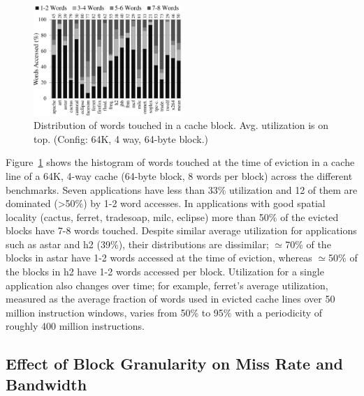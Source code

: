 \begin{figure}[!h]

 \begin{center}
  \includegraphics[width=0.5\textwidth]{files/Plots/05-StackBar_Word_Access_64K.pdf}
  \caption{Distribution of words touched in a cache
    block. Avg. utilization is on top. (Config:
    64K, 4 way, 64-byte block.)}
  \label{fig:stackbar_words_64k}
 \end{center}

\end{figure}

Figure~\ref{fig:stackbar_words_64k} shows the histogram of words
touched at the time of eviction in a cache line of a 64K, 4-way cache 
(64-byte block, 8 words per block) across the different benchmarks. 
Seven applications have
less than 33\% utilization and 12 of them are dominated (>50\%) by 1-2
word accesses.  In applications with good spatial locality (cactus,
ferret, tradesoap, milc, eclipse) more than 50\% of the evicted blocks have
7-8 words touched. Despite similar average utilization for
applications such as astar and h2 (39\%), their distributions
are dissimilar; $\simeq$70\% of the blocks in astar have 1-2 words
accessed at the time of eviction, 
whereas $\simeq$50\% of the blocks in h2 have 1-2 words accessed per block.  
Utilization for a single application also changes over time; for example, ferret's 
average utilization, measured as the average fraction of words used in 
evicted cache lines over 50 million instruction windows, 
varies from 50\% to 95\% with a periodicity of roughly 400 million instructions.   


\subsection{Effect of Block Granularity on Miss Rate and Bandwidth}

